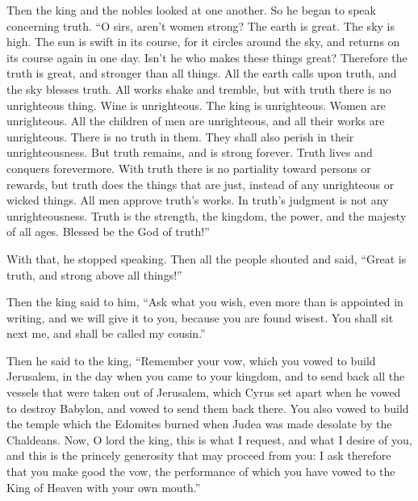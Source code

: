  Then the king and the nobles looked at one another. So
he began to speak concerning truth.  ``O sirs, aren't
women strong? The earth is great. The sky is high. The sun is swift in
its course, for it circles around the sky, and returns on its course
again in one day.  Isn't he who makes these things great?
Therefore the truth is great, and stronger than all things.
 All the earth calls upon truth, and the sky blesses
truth. All works shake and tremble, but with truth there is no
unrighteous thing.  Wine is unrighteous. The king is
unrighteous. Women are unrighteous. All the children of men are
unrighteous, and all their works are unrighteous. There is no truth in
them. They shall also perish in their unrighteousness. 
But truth remains, and is strong forever. Truth lives and conquers
forevermore.  With truth there is no partiality toward
persons or rewards, but truth does the things that are just, instead of
any unrighteous or wicked things. All men approve truth's works.
 In truth's judgment is not any unrighteousness. Truth is
the strength, the kingdom, the power, and the majesty of all ages.
Blessed be the God of truth!''

 With that, he stopped speaking. Then all the people
shouted and said, ``Great is truth, and strong above all things!''

 Then the king said to him, ``Ask what you wish, even
more than is appointed in writing, and we will give it to you, because
you are found wisest. You shall sit next me, and shall be called my
cousin.''

 Then he said to the king, ``Remember your vow, which you
vowed to build Jerusalem, in the day when you came to your kingdom,
 and to send back all the vessels that were taken out of
Jerusalem, which Cyrus set apart when he vowed to destroy Babylon, and
vowed to send them back there.  You also vowed to build
the temple which the Edomites burned when Judea was made desolate by the
Chaldeans.  Now, O lord the king, this is what I request,
and what I desire of you, and this is the princely generosity that may
proceed from you: I ask therefore that you make good the vow, the
performance of which you have vowed to the King of Heaven with your own
mouth.''

